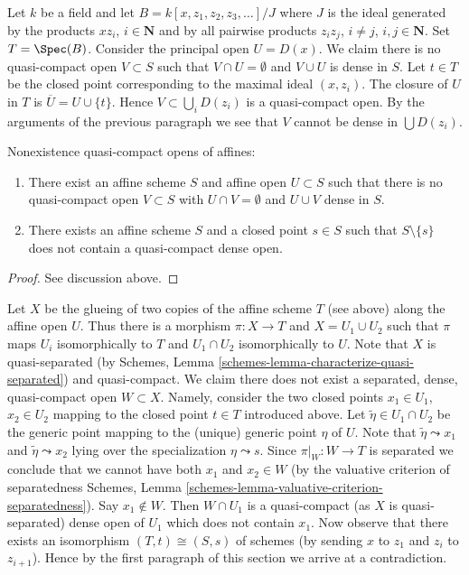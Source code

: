 \medskip\noindent
Let $k$ be a field and let $B = k[x, z_1, z_2, z_3, \ldots]/J$ where $J$
is the ideal generated by the products $xz_i$, $i \in \mathbf{N}$ and by
all pairwise products $z_iz_j$, $i \not = j$, $i, j \in \mathbf{N}$.
Set $T = \Spec(B)$. Consider the principal open $U = D(x)$.
We claim there is no quasi-compact open $V \subset S$ such that
$V \cap U = \emptyset$ and $V \cup U$ is dense in $S$.
Let $t \in T$ be the closed point corresponding to the maximal
ideal $(x, z_i)$. The closure of $U$ in $T$ is
$\overline{U} = U \cup \{t\}$. Hence $V \subset \bigcup_i D(z_i)$
is a quasi-compact open. By the arguments of the previous paragraph
we see that $V$ cannot be dense in $\bigcup D(z_i)$.

\begin{lemma}
\label{lemma-complement-of-affine-does-not-contain-qc-dense-open}
Nonexistence quasi-compact opens of affines:
\begin{enumerate}
\item There exist an affine scheme $S$ and affine open $U \subset S$
such that there is no quasi-compact open $V \subset S$ with
$U \cap V = \emptyset$ and $U \cup V$ dense in $S$.
\item There exists an affine scheme $S$ and a closed point $s \in S$ such that
$S \setminus \{s\}$ does not contain a quasi-compact dense open.
\end{enumerate}
\end{lemma}

\begin{proof}
See discussion above.
\end{proof}

\noindent
Let $X$ be the glueing of two copies of the affine scheme $T$ (see above)
along the affine open $U$. Thus there is a morphism $\pi : X \to T$ and
$X = U_1 \cup U_2$ such that $\pi$ maps $U_i$ isomorphically to $T$ and
$U_1 \cap U_2$ isomorphically to $U$. Note that $X$ is quasi-separated
(by Schemes, Lemma \ref{schemes-lemma-characterize-quasi-separated})
and quasi-compact. We claim there does not exist a separated, dense,
quasi-compact open $W \subset X$. Namely, consider the two closed
points $x_1 \in U_1$, $x_2 \in U_2$ mapping to the closed point $t \in T$
introduced above. Let $\tilde \eta \in U_1 \cap U_2$ be the generic point
mapping to the (unique) generic point $\eta$ of $U$.
Note that $\tilde\eta \leadsto x_1$ and $\tilde\eta \leadsto x_2$
lying over the specialization $\eta \leadsto s$.
Since $\pi|_W : W \to T$ is separated we conclude that we cannot have both
$x_1$ and $x_2 \in W$ (by the valuative criterion of separatedness
Schemes, Lemma \ref{schemes-lemma-valuative-criterion-separatedness}).
Say $x_1 \not \in W$. Then $W \cap U_1$ is a quasi-compact (as $X$
is quasi-separated) dense open of $U_1$ which does not contain $x_1$.
Now observe that there exists an isomorphism $(T, t) \cong (S, s)$
of schemes (by sending $x$ to $z_1$ and $z_i$ to $z_{i + 1}$).
Hence by the first paragraph of this section we arrive at a contradiction.

